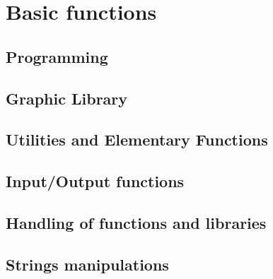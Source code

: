              \textheight=660pt 
             \textwidth=15cm
             \topmargin=-27pt 
             \oddsidemargin=0.7cm
             \evensidemargin=0.7cm
             \marginparwidth=60pt
\def\vector#1{\left( \begin{array}{c} #1  \end{array}\right)}
\def\matrixq#1{\left( \begin{array}{cc} #1  \end{array}\right)}
\def\sciverb#1{\mbox{\tt #1}}   
\makeindex 

%




\tableofcontents
\part{Basic functions}
\chapter{Programming}
\setcounter{section}{1}\setcounter{subsection}{0}
         
\chapter{Graphic Library }
\setcounter{section}{1}\setcounter{subsection}{0}
         
\chapter{Utilities and Elementary Functions}
\setcounter{section}{1}\setcounter{subsection}{0}
         
\chapter{Input/Output functions}
\setcounter{section}{1}\setcounter{subsection}{0}
         
\chapter{Handling of functions and libraries}
\setcounter{section}{1}\setcounter{subsection}{0}
        
\chapter{Strings manipulations}
\setcounter{section}{1}\setcounter{subsection}{0}
        
